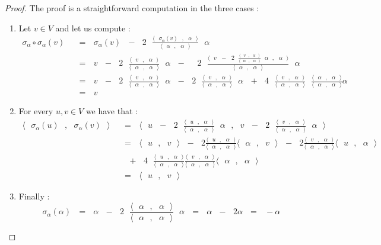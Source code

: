 \documentclass[envcountsame,envcountchap]{svmono}
\newcommand{\prods}[2]{\langle\qq #1\qq,\qq#2\qq\rangle}
\newcommand{\qq}{\text{ }}
\begin{document}
\begin{proof}
	The proof is a straightforward computation in the three cases :
	\begin{enumerate}
		\item Let $v\in V$ and let us compute :
		\begin{equation}
		\begin{split}
		\sigma_\alpha\circ\sigma_\alpha(v)\qq&=\qq \sigma_\alpha(v)\qq -\qq 2\qq \frac{\prods{\sigma_\alpha(v)}{\alpha}}{\prods{\alpha}{\alpha}}\qq\alpha\\
		&=\qq  v\qq -\qq 2\qq \frac{\prods{v}{\alpha}}{\prods{\alpha}{\alpha}}\qq\alpha \qq -\qq \qq 2\qq \frac{\prods{v\qq -\qq 2\qq \frac{\prods{v}{\alpha}}{\prods{\alpha}{\alpha}}\qq\alpha}{\alpha}}{\prods{\alpha}{\alpha}}\qq\alpha\\
		&=\qq  v\qq -\qq 2\qq \frac{\prods{v}{\alpha}}{\prods{\alpha}{\alpha}}\qq\alpha \qq-\qq 2\qq \frac{\prods{v}{\alpha}}{\prods{\alpha}{\alpha}}\qq\alpha \qq+\qq 4 \qq \frac{\prods{v}{\alpha}}{\prods{\alpha}{\alpha}} \qq \frac{\prods{\alpha}{\alpha}}{\prods{\alpha}{\alpha}}\alpha\\
		&=\qq v
		\end{split}
		\end{equation}
		\item For every $u,v\in V$ we have that :
		\begin{equation}
		\begin{split}
		\prods{\sigma_\alpha(u)}{\sigma_\alpha(v)}\qq&=\qq\prods{ u\qq -\qq 2\qq \frac{\prods{u}{\alpha}}{\prods{\alpha}{\alpha}}\qq\alpha}{ v\qq -\qq 2\qq \frac{\prods{v}{\alpha}}{\prods{\alpha}{\alpha}}\qq\alpha}\\
		&=\qq\prods{u}{v}\qq-\qq 2  \frac{\prods{u}{\alpha}}{\prods{\alpha}{\alpha}} \prods{\alpha}{v}\qq -\qq 2 \frac{\prods{v}{\alpha}}{\prods{\alpha}{\alpha}}\prods{u}{\alpha}\\
		&\qq +\qq 4\qq \frac{\prods{u}{\alpha}}{\prods{\alpha}{\alpha}}\frac{\prods{v}{\alpha}}{\prods{\alpha}{\alpha}}\prods{\alpha}{\alpha}\\
		&=\qq \prods{u}{v}
		\end{split}
		\end{equation}
		\item Finally :
		\begin{equation}
		\sigma_\alpha(\alpha)\qq=\qq \alpha\qq -\qq 2\qq \frac{\prods{\alpha}{\alpha}}{\prods{\alpha}{\alpha}}\qq\alpha\qq=\qq \alpha\qq -\qq 2 \alpha\qq=\qq -\alpha
		\end{equation}
	\end{enumerate}
\end{proof}
\end{document}
